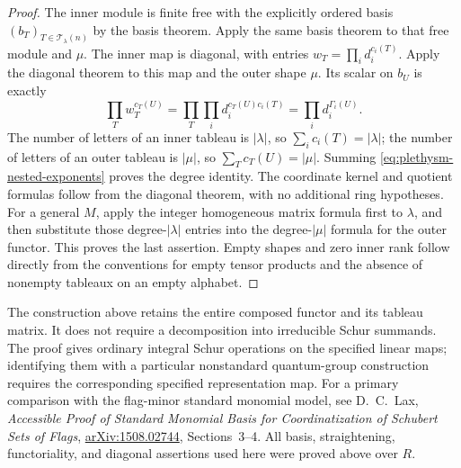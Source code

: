 \begin{proof}
The inner module is finite free with the explicitly ordered basis
$(b_T)_{T\in\mathcal T_\lambda(n)}$ by the basis theorem.
Apply the same basis theorem to that free module and $\mu$.
The inner map is diagonal, with entries
$w_T=\prod_i d_i^{c_i(T)}$. Apply the diagonal theorem to this
map and the outer shape $\mu$. Its scalar on $b_U$ is exactly
\[
 \prod_T w_T^{c_T(U)}
   =\prod_T\prod_i d_i^{c_T(U)c_i(T)}
   =\prod_i d_i^{\Gamma_i(U)}.
\]
The number of letters of an inner tableau is $|\lambda|$, so
$\sum_i c_i(T)=|\lambda|$; the number of letters of an outer
tableau is $|\mu|$, so $\sum_T c_T(U)=|\mu|$. Summing
\eqref{eq:plethysm-nested-exponents} proves the degree identity.
The coordinate kernel and quotient formulas follow from the
diagonal theorem, with no additional ring hypotheses.
For a general $M$, apply the integer homogeneous matrix formula
first to $\lambda$, and then substitute those degree-$|\lambda|$
entries into the degree-$|\mu|$ formula for the outer functor.
This proves the last assertion. Empty shapes and zero inner
rank follow directly from the conventions for empty tensor
products and the absence of nonempty tableaux on an empty
alphabet.
\end{proof}

The construction above retains the entire composed functor and
its tableau matrix. It does not require a decomposition into
irreducible Schur summands. The proof gives ordinary integral
Schur operations on the specified linear maps; identifying them
with a particular nonstandard quantum-group construction requires
the corresponding specified representation map.
For a primary comparison with the flag-minor standard monomial
model, see D.~C.~Lax, \emph{Accessible Proof of Standard Monomial
Basis for Coordinatization of Schubert Sets of Flags},
\href{https://arxiv.org/abs/1508.02744}{arXiv:1508.02744},
Sections~3--4. All basis, straightening, functoriality, and
diagonal assertions used here were proved above over $R$.
